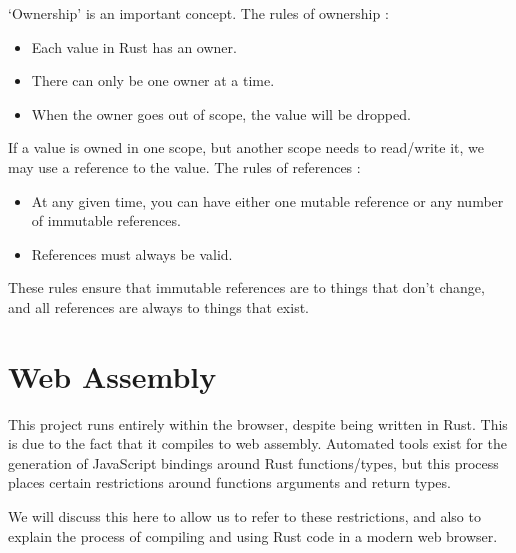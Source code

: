 `Ownership' is an important concept. The rules of ownership \cite{rust_book}:
\begin{itemize}
    \item Each value in Rust has an owner.
    \item There can only be one owner at a time.
    \item When the owner goes out of scope, the value will be dropped.
\end{itemize}   

If a value is owned in one scope, but another scope needs to read/write it, we may use a reference to the value. The rules of references \cite{rust_book}:
\begin{itemize}
    \item At any given time, you can have either one mutable reference or any number of immutable references. 
    \item References must always be valid.
\end{itemize}

These rules ensure that immutable references are to things that don't change, and all references are always to things that exist.



\section{Web Assembly} \label{bg:wasm}
This project runs entirely within the browser, despite being written in Rust. This is due to the fact that it compiles to web assembly. Automated tools exist for the generation of JavaScript bindings around Rust functions/types, but this process places certain restrictions around functions arguments and return types. 

We will discuss this here to allow us to refer to these restrictions, and also to explain the process of compiling and using Rust code in a modern web browser. 

